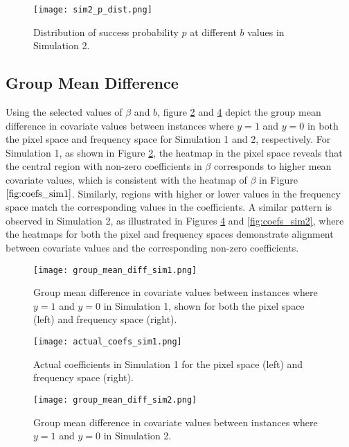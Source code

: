 \documentclass[12pt]{article}
\begin{document}
\begin{figure}[h!] 
	\centering
	\texttt{[image: sim2\_p\_dist.png]} 
  \caption{Distribution of success probability \( p \) at different \( b \) values in Simulation 2.}
	\label{fig:sim2_p_dist} 
\end{figure}

\FloatBarrier

\subsection*{Group Mean Difference}

Using the selected values of \( \beta \) and \( b \), figure \ref{fig:group_diff1} and \ref{fig:group_diff2} depict the group mean difference in covariate values between instances where \( y = 1 \) and \( y = 0 \) in both the pixel space and frequency space for Simulation 1 and 2, respectively. For Simulation 1, as shown in Figure \ref{fig:group_diff1}, the heatmap in the pixel space reveals that the central region with non-zero coefficients in \( \beta \) corresponds to higher mean covariate values, which is consistent with the heatmap of \( \beta \) in Figure \( \ref{fig:coefs_sim1} \). Similarly, regions with higher or lower values in the frequency space match the corresponding values in the coefficients. A similar pattern is observed in Simulation 2, as illustrated in Figures \ref{fig:group_diff2} and \ref{fig:coefs_sim2}, where the heatmaps for both the pixel and frequency spaces demonstrate alignment between covariate values and the corresponding non-zero coefficients. 

\begin{figure}[h!] 
	\centering
	\texttt{[image: group\_mean\_diff\_sim1.png]}
	\caption{Group mean difference in covariate values between instances where \( y = 1 \) and \( y = 0 \) in Simulation
  1, shown for both the pixel space (left) and frequency space (right).}
	\label{fig:group_diff1}
\end{figure}

\begin{figure}[h!] 
	\centering
	\texttt{[image: actual\_coefs\_sim1.png]}
  \caption{Actual coefficients in Simulation 1 for the pixel space (left) and frequency space (right).}
  \label{fig:coefs_sim1}
\end{figure}

\begin{figure}[h!] 
	\centering
	\texttt{[image: group\_mean\_diff\_sim2.png]}
	\caption{Group mean difference in covariate values between instances where \( y = 1 \) and \( y = 0 \) in Simulation 2.}
	\label{fig:group_diff2}
\end{figure}
\end{document}
